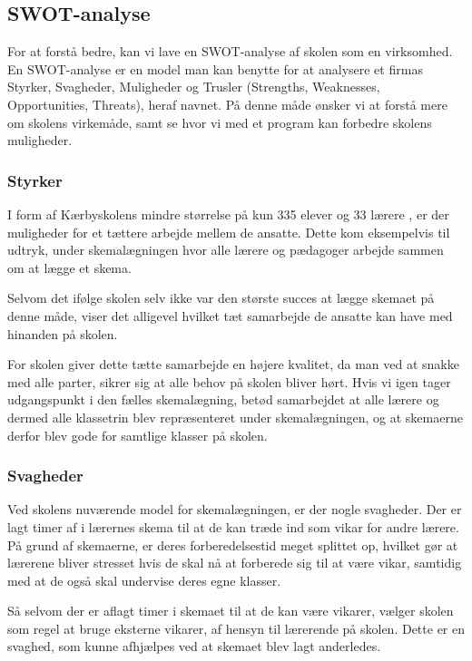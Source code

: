 \subsection{SWOT-analyse}
For at forstå \school bedre, kan vi lave en SWOT-analyse af skolen som en virksomhed. En SWOT-analyse er en model man kan benytte for at analysere et firmas Styrker, Svagheder, Muligheder og Trusler (Strengths, Weaknesses, Opportunities, Threats), heraf navnet. På denne måde ønsker vi at forstå mere om skolens virkemåde, samt se hvor vi med et program kan forbedre skolens muligheder.

\subsubsection*{Styrker}
I form af Kærbyskolens mindre størrelse på kun 335 elever og 33 lærere \cite{Kaerbyskolens-laerere}, er der muligheder for et tættere arbejde mellem de ansatte. Dette kom eksempelvis til udtryk, under skemalægningen hvor alle lærere og pædagoger arbejde sammen om at lægge et skema.

Selvom det ifølge skolen selv ikke var den største succes at lægge skemaet på denne måde, viser det alligevel hvilket tæt samarbejde de ansatte kan have med hinanden på skolen.

For skolen giver dette tætte samarbejde en højere kvalitet, da man ved at snakke med alle parter, sikrer sig at alle behov på skolen bliver hørt. Hvis vi igen tager udgangspunkt i den fælles skemalægning, betød samarbejdet at alle lærere og dermed alle klassetrin blev repræsenteret under skemalægningen, og at skemaerne derfor blev gode for samtlige klasser på skolen. 

\subsubsection*{Svagheder}
Ved skolens nuværende model for skemalægningen, er der nogle svagheder. Der er lagt timer af i lærernes skema til at de kan træde ind som vikar for andre lærere. På grund af skemaerne, er deres forberedelsestid meget splittet op, hvilket gør at lærerene bliver stresset hvis de skal nå at forberede sig til at være vikar, samtidig med at de også skal undervise deres egne klasser.

Så selvom der er aflagt timer i skemaet til at de kan være vikarer, vælger skolen som regel at bruge eksterne vikarer, af hensyn til lærerende på skolen. Dette er en svaghed, som kunne afhjælpes ved at skemaet blev lagt anderledes.

